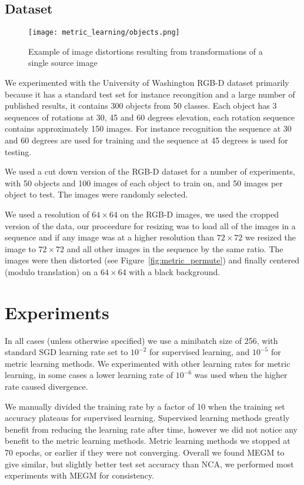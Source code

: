 \subsection {Dataset}

\begin{figure}[h]
\centering
\texttt{[image: metric\_learning/objects.png]}
\caption{Example of image distortions resulting from transformations of a single source image}
\label{fig:metric_dataset}
\end{figure}

We experimented with the University of Washington RGB-D dataset primarily because it has a standard test set for instance recongition and a large number of published results, it contains 300 objects from 50 classes. Each object has 3 sequences of rotations at 30, 45 and 60 degrees elevation, each rotation sequence contains approximately 150 images. For instance recognition the sequence at 30 and 60 degrees are used for training and the sequence at 45 degrees is used for testing. 

We used a cut down version of the RGB-D dataset for a number of experiments, with 50 objects and 100 images of each object to train on, and 50 images per object to test. The images were randomly selected.

We used a resolution of $ 64\times64 $ on the RGB-D images, we used the cropped version of the data, our proceedure for resizing was to load all of the images in a sequence and if any image was at a higher resolution than $ 72\times72 $ we resized the image to $ 72\times72 $ and all other images in the sequence by the same ratio. The images were then distorted (see Figure~\ref{fig:metric_permute}) and finally centered (modulo translation) on a  $ 64\times64 $ with a black background.


\section {Experiments}


In all cases (unless otherwise specified) we use a minibatch size of 256, with standard \gls{SGD} learning rate set to $ 10^{-2} $ for supervised learning, and $ 10^{-5} $ for metric learning methods. We experimented with other learning rates for metric learning, in some cases a lower learning rate of $ 10^{-6} $ was used when the higher rate caused divergence.

We manually divided the training rate by a factor of 10 when the training set accuracy plateaus for supervised learning. Supervised learning methods greatly benefit from reducing the learning rate after time, however we did not notice any benefit to the metric learning methods. Metric learning methods we stopped at 70 epochs, or earlier if they were not converging. Overall we found \gls{MEGM} to give similar, but slightly better test set accuracy than \gls{NCA}, we performed most experiments with \gls{MEGM} for consistency.



